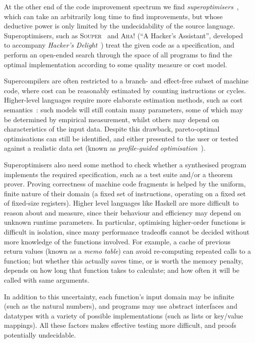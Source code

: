 At the other end of the code improvement spectrum we find
\emph{superoptimisers}~\cite{massalin1987superoptimizer}, which can take an
arbitrarily long time to find improvements, but whose deductive power is only
limited by the undecidability of the source language. Superoptimisers, such as
\textsc{Souper}~\cite{sasnauskas2017souper} and \textsc{Aha!} (``A Hacker's
Assistant'', developed to accompany \emph{Hacker's
  Delight}~\cite{warren2013hacker}) treat the given code as a specification, and
perform an open-ended search through the space of all programs to find the
optimal implementation according to some quality measure or cost model.

Supercompilers are often restricted to a branch- and effect-free subset of
machine code, where cost can be reasonably estimated by counting instructions or
cycles. Higher-level languages require more elaborate estimation methods, such
as cost semantics~\cite{danner2015denotational}: such models will still contain
many parameters, some of which may be determined by empirical measurement,
whilst others may depend on characteristics of the input data. Despite this
drawback, pareto-optimal optimisations can still be identified, and either
presented to the user or tested against a realistic data set (known as
\emph{profile-guided optimisation}~\cite{TODO}).

Superoptimisers also need some method to check whether a synthesised program
implements the required specification, such as a test suite and/or a theorem
prover. Proving correctness of machine code fragments is helped by the uniform,
finite nature of their domain (a fixed set of instructions, operating on a fixed
set of fixed-size registers). Higher level languages like Haskell are more
difficult to reason about and measure, since their behaviour and efficiency may
depend on unknown runtime parameters. In particular, optimising higher-order
functions is difficult in isolation, since many performance tradeoffs cannot be
decided without more knowledge of the functions involved. For example, a cache
of previous return values (known as a \emph{memo table}) can avoid re-computing
repeated calls to a function; but whether this actually saves time, or is worth
the memory penalty, depends on how long that function takes to calculate; and
how often it will be called with same arguments.

In addition to this uncertainty, each function's input domain may be infinite
(such as the natural numbers), and programs may use abstract interfaces and
datatypes with a variety of possible implementations (such as lists or key/value
mappings). All these factors makes effective testing more difficult, and proofs
potentially undecidable.

